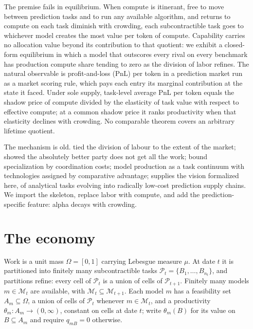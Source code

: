 \documentclass[preprint,11pt,authoryear]{elsarticle}
\begin{document}
The premise fails in equilibrium. When compute is itinerant, free to move between prediction tasks and to run any available algorithm, and returns to compute on each task diminish with crowding, each subcontractible task goes to whichever model creates the most value per token of compute. Capability carries no allocation value beyond its contribution to that quotient: we exhibit a closed-form equilibrium in which a model that outscores every rival on every benchmark has production compute share tending to zero as the division of labor refines. The natural observable is profit-and-loss (PnL) per token in a prediction market run as a market scoring rule, which pays each entry its marginal contribution at the state it faced. Under sole supply, task-level average PnL per token equals the shadow price of compute divided by the elasticity of task value with respect to effective compute; at a common shadow price it ranks productivity when that elasticity declines with crowding. No comparable theorem covers an arbitrary lifetime quotient.

The mechanism is old. \citet{smith1776} tied the division of labour to the extent of the market; \citet{ricardo1817} showed the absolutely better party does not get all the work; \citet{beckermurphy1992} bound specialization by coordination costs; \citet{acemogluautor2011} model production as a task continuum with technologies assigned by comparative advantage; \citet{cotton2022} supplies the vision formalized here, of analytical tasks evolving into radically low-cost prediction supply chains. We import the skeleton, replace labor with compute, and add the prediction-specific feature: alpha decays with crowding.

\section{The economy}
\label{sec:economy}

Work is a unit mass $\Omega = [0,1]$ carrying Lebesgue measure $\mu$. At date $t$ it is partitioned into finitely many subcontractible tasks $\mathcal{P}_t = \{B_1, \ldots, B_{n_t}\}$, and partitions refine: every cell of $\mathcal{P}_t$ is a union of cells of $\mathcal{P}_{t+1}$. Finitely many models $m \in \mathcal{M}_t$ are available, with $\mathcal{M}_t \subseteq \mathcal{M}_{t+1}$. Each model $m$ has a feasibility set $A_m \subseteq \Omega$, a union of cells of $\mathcal{P}_t$ whenever $m \in \mathcal{M}_t$, and a productivity $\theta_m : A_m \to (0,\infty)$, constant on cells at date $t$; write $\theta_m(B)$ for its value on $B \subseteq A_m$ and require $q_{mB} = 0$ otherwise.
\end{document}
